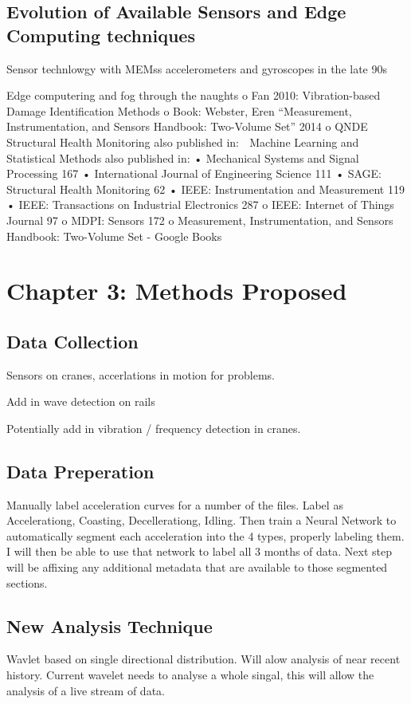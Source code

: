 \documentclass[journal=jacsat,manuscript=article]{achemso}
\begin{document}
\subsection{Evolution of Available Sensors and Edge Computing techniques}
Sensor technlowgy with MEMss accelerometers and gyroscopes in the late 90s

Edge computering and fog through the naughts
o	Fan 2010: Vibration-based Damage Identification Methods
o	Book: Webster, Eren “Measurement, Instrumentation, and Sensors Handbook: Two-Volume Set” 2014	
o	QNDE 
	Structural Health Monitoring also published in:
	Machine Learning and Statistical Methods also published in:
•	Mechanical Systems and Signal Processing  167
•	International Journal of Engineering Science  111
•	SAGE: Structural Health Monitoring  62
•	IEEE: Instrumentation and Measurement    119
•	IEEE: Transactions on Industrial Electronics   287
o	IEEE: Internet of Things Journal   97
o	MDPI: Sensors  172
o	Measurement, Instrumentation, and Sensors Handbook: Two-Volume Set - Google Books


\pagebreak
\section{Chapter 3: Methods Proposed}
\subsection{Data Collection}

Sensors on cranes, accerlations in motion for problems.

Add in wave detection on rails

Potentially add in vibration / frequency detection in cranes.

\subsection{Data Preperation}
Manually label acceleration curves for a number of the files.  Label as Accelerationg, Coasting, Decellerationg, Idling.  Then train a Neural Network to automatically segment each acceleration into the 4 types, properly labeling them.  I will then be able to use that network to label all 3 months of data.  Next step will be affixing any additional metadata that are available to those segmented sections.

\subsection{New Analysis Technique}
Wavlet based on single directional distribution.  Will alow analysis of near recent history.  Current wavelet needs to analyse a whole singal, this will allow the analysis of a live stream of data.
\end{document}
